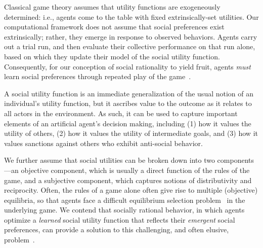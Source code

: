 Classical game theory assumes that utility functions are exogeneously
determined: i.e., agents come to the table with fixed
extrinsically-set utilities.
Our computational framework does not assume that social preferences
exist extrinsically; rather, they emerge in response to observed
behaviors.  Agents carry out a trial run, and then evaluate their
collective performance on that run alone, based on which they update
their model of the social utility function.
Consequently, for our conception of social rationality to yield fruit,
agents \emph{must\/} learn social preferences through repeated play of
the game~\cite{FL}.

A social utility function is an immediate generalization of the usual
notion of an individual's utility function, but it ascribes value to
the outcome as it relates to all actors in the environment.
%
%
As such, it can be used to capture important elements of an artificial
agent's decision making, including (1) how it values the utility of
others, (2) how it values the utility of intermediate goals, and (3)
how it values sanctions against others who exhibit anti-social behavior.

We further assume that social utilities can be broken down into two
components---an objective component, which is usually a direct
function of the rules of the game, and a subjective component, which
captures notions of distributivity and reciprocity.
%
Often, the rules of a game alone often give rise to multiple
(objective) equilibria, so that agents face a difficult equilibrium
selection problem~\cite{} in the underlying game.  We contend that
socially rational behavior, in which agents optimize a
\emph{learned\/} social utility function that reflects their
\emph{emergent\/} social preferences, can provide a solution to this
challenging, and often elusive, problem~\cite{Binmore?}.


